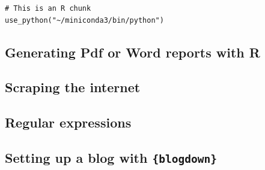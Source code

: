 \documentclass[
]{article}
\begin{document}
\begin{verbatim}
# This is an R chunk
use_python("~/miniconda3/bin/python")
\end{verbatim}

\hypertarget{generating-pdf-or-word-reports-with-r}{%
\subsection{Generating Pdf or Word reports with R}\label{generating-pdf-or-word-reports-with-r}}

\hypertarget{scraping-the-internet}{%
\subsection{Scraping the internet}\label{scraping-the-internet}}

\hypertarget{regular-expressions}{%
\subsection{Regular expressions}\label{regular-expressions}}

\hypertarget{setting-up-a-blog-with-blogdown}{%
\subsection{\texorpdfstring{Setting up a blog with \texttt{\{blogdown\}}}{Setting up a blog with \{blogdown\}}}\label{setting-up-a-blog-with-blogdown}}

  
\end{document}
